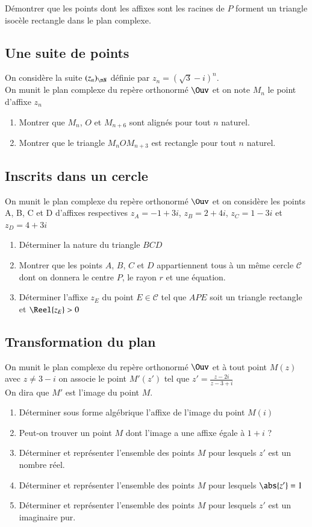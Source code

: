 \documentclass[oneside,12pt]{article}          %
\begin{document}
Démontrer que les points dont les affixes sont les racines de $P$ forment un triangle isocèle rectangle dans le plan complexe.


\subsection{Une suite de points}

On considère la suite $(z_n)_{\nN}$ définie par $z_n=(\sqrt{3}-i)^n$. \\
On munit le plan complexe du repère orthonormé $\Ouv$ et on note $M_n$ le point d'affixe $z_n$
\begin{enumerate}
    \item Montrer que $M_n$, $O$ et $M_{n+6}$ sont alignés pour tout $n$ naturel.
    \item Montrer que le triangle $M_nOM_{n+3}$ est rectangle pour tout $n$ naturel.
\end{enumerate}



\subsection{Inscrits dans un cercle}
On munit le plan complexe du repère orthonormé $\Ouv$ et on considère les points A, B, C et D d'affixes respectives $z_A=-1+3i$, $z_B=2+4i$, $z_C=1-3i$ et $z_D=4+3i$

\begin{enumerate}
    \item Déterminer la nature du triangle $BCD$
    \item Montrer que les points $A$, $B$, $C$ et $D$ appartiennent tous à un même cercle $\mathscr{C}$ dont on donnera le centre $P$, le rayon $r$ et une équation.
    \item Déterminer l'affixe $z_E$ du point $E\in\mathscr{C}$ tel que $APE$ soit un triangle rectangle et $\Reel{z_E}>0$ 
\end{enumerate}



\subsection{Transformation du plan}
On munit le plan complexe du repère orthonormé $\Ouv$ et à tout point $M(z)$ avec $z\neq3-i$ on associe le point $M'(z')$ tel que $z'=\frac{z-2i}{z-3+i}$\\
On dira que $M'$ est l'image du point $M$.
\begin{enumerate}
	\item Déterminer sous forme algébrique l'affixe de l'image du point $M(i)$
	\item Peut-on trouver un point $M$ dont l'image a une affixe égale à $1+i$ ?
	\item Déterminer et représenter l'ensemble des points $M$ pour lesquels $z'$ est un nombre réel.
	\item Déterminer et représenter l'ensemble des points $M$ pour lesquels $\abs{z'}=1$
	\item Déterminer et représenter l'ensemble des points $M$ pour lesquels $z'$ est un imaginaire pur.
\end{enumerate}
\end{document}
